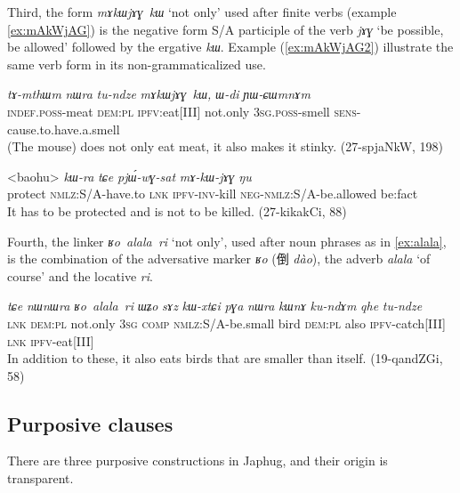 \documentclass[oneside,a4paper,11pt]{article}
\newcommand{\ipa}[1]{\mbox{\phon\textit{#1}}} %
\newcommand{\zh}[1]{{\cn #1}}
\begin{document}
Third, the form \ipa{mɤkɯjɤɣ kɯ} `not only' used after finite verbs (example \ref{ex:mAkWjAG}) is the negative form S/A participle of the verb \ipa{jɤɣ} `be possible, be allowed' followed by the ergative \ipa{kɯ}. Example (\ref{ex:mAkWjAG2}) illustrate the same verb form in its non-grammaticalized use.

 \begin{exe}
\ex \label{ex:mAkWjAG}
\gll  \ipa{tɤ-mthɯm} 	\ipa{nɯra} 	\ipa{tu-ndze} 	\ipa{mɤkɯjɤɣ kɯ,} 	\ipa{ɯ-di} 	\ipa{ɲɯ-ɕɯmnɤm}  \\
\textsc{indef.poss}-meat \textsc{dem:pl} \textsc{ipfv}:eat[III] not.only \textsc{3sg.poss}-smell \textsc{sens}-cause.to.have.a.smell \\
\glt  (The mouse) does not only eat meat, it also makes it stinky. (27-spjaNkW, 198)
\end{exe}


 \begin{exe}
\ex \label{ex:mAkWjAG2}
\gll
<baohu> 	\ipa{kɯ-ra} 	\ipa{tɕe} 	\ipa{pjɯ́-wɣ-sat} 	\ipa{mɤ-kɯ-jɤɣ} \ipa{ŋu} \\
protect \textsc{nmlz}:S/A-have.to \textsc{lnk} \textsc{ipfv-inv}-kill \textsc{neg-nmlz}:S/A-be.allowed be:fact \\ 
\glt It has to be protected and is not to be killed. (27-kikakCi, 88)
\end{exe}

Fourth, the linker \ipa{ʁo alala ri} `not only', used after noun phrases as in \ref{ex:alala}, is the combination of the adversative marker \ipa{ʁo} (\zh{倒}  \textit{dào}), the adverb \ipa{alala} `of course' and the locative \ipa{ri}.

 \begin{exe}
\ex \label{ex:alala}
\gll  \ipa{tɕe} 	\ipa{nɯnɯra} 	\ipa{ʁo alala ri} 	\ipa{ɯʑo} 	\ipa{sɤz} 	\ipa{kɯ-xtɕi} 	\ipa{pɣa} 	\ipa{nɯra} 	\ipa{kɯnɤ} 	\ipa{ku-ndɤm} 	\ipa{qhe} 	\ipa{tu-ndze} \\
\textsc{lnk} \textsc{dem:pl} not.only \textsc{3sg} \textsc{comp} \textsc{nmlz}:S/A-be.small bird \textsc{dem:pl} also \textsc{ipfv}-catch[III] \textsc{lnk} \textsc{ipfv}-eat[III] \\
\glt In addition to these, it also eats birds that are smaller than itself. (19-qandZGi, 58)
\end{exe}

 \subsection{Purposive clauses}
There are three purposive constructions in Japhug, and their origin is transparent.
\end{document}
